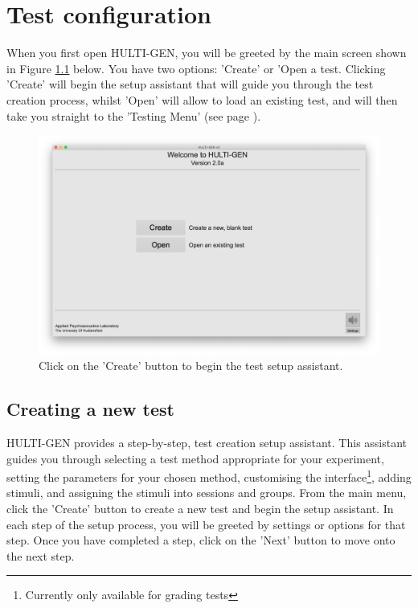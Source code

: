 \chapter{Test configuration}
When you first open HULTI-GEN, you will be greeted by the main screen shown in Figure \ref{mainScreen} below. You have two options: 'Create' or 'Open a test. Clicking 'Create' will begin the setup assistant that will guide you through the test creation process, whilst 'Open' will allow to load an existing test, and will then take you straight to the 'Testing Menu' (see page \pageref{chap::run}).
\begin{figure}[ht]
	\centering
	\includegraphics[width=1.0\textwidth]{./images/createTest_step01_mainScreen.png}
	\caption{Click on the 'Create' button to begin the test setup assistant.}
	\label{mainScreen}
\end{figure}
\pagebreak

\section{Creating a new test}
HULTI-GEN provides a step-by-step, test creation setup assistant. This assistant guides you through selecting a test method appropriate for your experiment, setting the parameters for your chosen method, customising the interface\footnote{Currently only available for grading tests}, adding stimuli, and assigning the stimuli into sessions and groups.
\newline\newline
From the main menu, click the 'Create' button to create a new test and begin the setup assistant. In each step of the setup process, you will be greeted by settings or options for that step. Once you have completed a step, click on the 'Next' button to move onto the next step.

